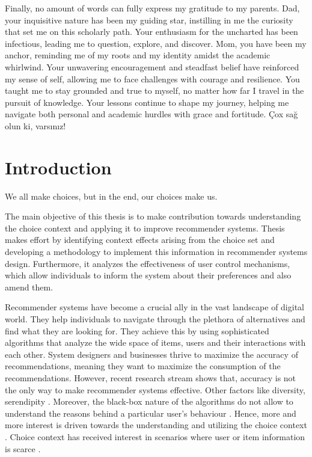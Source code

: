 \documentclass[a4paper,12pt]{article}
\begin{document}
Finally, no amount of words can fully express my gratitude to my parents. Dad, your inquisitive nature has been my guiding star, instilling in me the curiosity that set me on this scholarly path. Your enthusiasm for the uncharted has been infectious, leading me to question, explore, and discover. Mom, you have been my anchor, reminding me of my roots and my identity amidst the academic whirlwind. Your unwavering encouragement and steadfast belief have reinforced my sense of self, allowing me to face challenges with courage and resilience. You taught me to stay grounded and true to myself, no matter how far I travel in the pursuit of knowledge. Your lessons continue to shape my journey, helping me navigate both personal and academic hurdles with grace and fortitude. Çox sağ olun ki, varsınız!



\clearpage
\tableofcontents
\newpage
\listoffigures
\clearpage
\listoftables
\newpage


\newpage
\section{Introduction}

\epigraph{We all make choices, but in the end, our choices make us.}{}


The main objective of this thesis is to make contribution towards understanding the choice context and applying it to improve recommender systems. Thesis makes effort by identifying context effects arising from the choice set and developing a methodology to implement this information in recommender systems design. Furthermore, it analyzes the effectiveness of user control mechanisms, which allow individuals to inform the system about their preferences and also amend them.

Recommender systems have become a crucial ally in the vast landscape of digital world. They help individuals to navigate through the plethora of alternatives and find what they are looking for. They achieve this by using sophisticated algorithms that analyze the wide space of items, users and their interactions with each other. System designers and businesses thrive to maximize the accuracy of recommendations, meaning they want to maximize the consumption of the recommendations. However, recent research stream shows that, accuracy is not the only way to make recommender systems effective. Other factors like diversity, serendipity \citep{kaminskas2016diversity}. Moreover, the black-box nature of the algorithms do not allow to understand the reasons behind a particular user's behaviour \citep{kotkovSurveySerendipityRecommender2016, samih2021exmrec2vec}. Hence, more and more interest is driven towards the understanding and utilizing the choice context \citep{adomavicius2005toward}. Choice context has received interest in scenarios where user or item information is scarce \citep{scheinMethodsMetricsColdStart}.  
\end{document}
